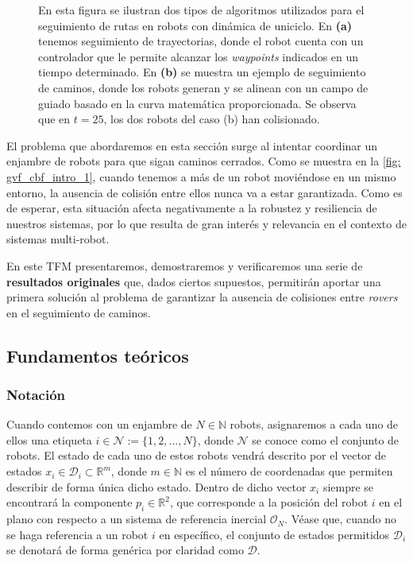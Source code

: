 \begin{figure}[h!]
    \caption{En esta figura se ilustran dos tipos de algoritmos utilizados para el seguimiento de rutas en robots con dinámica de uniciclo. En \textbf{(a)} tenemos seguimiento de trayectorias, donde el robot cuenta con un controlador que le permite alcanzar los \textit{waypoints} indicados en un tiempo determinado. En \textbf{(b)} se muestra un ejemplo de seguimiento de caminos, donde los robots generan y se alinean con un campo de guiado basado en la curva matemática proporcionada. Se observa que en $t = 25$, los dos robots del caso (b) han colisionado.}
    \label{fig: gvf_cbf_intro}
\end{figure}

\newpage

El problema que abordaremos en esta sección surge al intentar coordinar un enjambre de robots para que sigan caminos cerrados. Como se muestra en la \autoref{fig: gvf_cbf_intro_1}, cuando tenemos a más de un robot moviéndose en un mismo entorno, la ausencia de colisión entre ellos nunca va a estar garantizada. Como es de esperar, esta situación afecta negativamente a la robustez y resiliencia de nuestros sistemas, por lo que resulta de gran interés y relevancia en el contexto de sistemas multi-robot. 

En este TFM presentaremos, demostraremos y verificaremos una serie de \textbf{resultados originales} que, dados ciertos supuestos, permitirán aportar una primera solución al problema de garantizar la ausencia de colisiones entre \textit{rovers} en el seguimiento de caminos.


\subsection{Fundamentos teóricos} %



\subsubsection{Notación}

Cuando contemos con un enjambre de $N \in \mathds{N}$ robots, asignaremos a cada uno de ellos una etiqueta $i \in \mathcal{N} := \{1,2, ... ,N\}$, donde $\mathcal{N}$ se conoce como el conjunto de robots. El estado de cada uno de estos robots vendrá descrito por el vector de estados $x_i \in \mathcal{D}_i \subset \mathds{R}^m$, donde $m \in \mathds{N}$ es el número de coordenadas que permiten describir de forma única dicho estado. Dentro de dicho vector $x_i$ siempre se encontrará la componente $p_i \in \mathds{R}^2$, que corresponde a la posición del robot $i$ en el plano con respecto a un sistema de referencia inercial $\mathcal{O}_N$. Véase que, cuando no se haga referencia a un robot $i$ en específico, el conjunto de estados permitidos $\mathcal{D}_i$ se denotará de forma genérica por claridad como $\mathcal{D}$.

